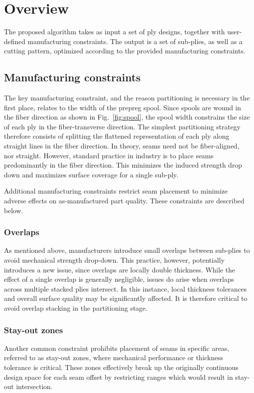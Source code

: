 \section{Overview}
\label{sec:overview}

The proposed algorithm takes as input a set of ply designs, together with user-defined manufacturing constraints. The output is a set of sub-plies, as well as a cutting pattern, optimized according to the provided manufacturing constraints.

\subsection{Manufacturing constraints}
The key manufacturing constraint, and the reason partitioning is necessary in the first place, relates to the width of the prepreg spool. Since spools are wound in the fiber direction as shown in Fig.~\ref{fig:spool}, the spool width constrains the size of each ply in the fiber-transverse direction. The simplest partitioning strategy therefore consists of splitting the flattened representation of each ply along straight lines in the fiber direction. In theory, seams need not be fiber-aligned, nor straight. However, standard practice in industry is to place seams predominantly in the fiber direction. This minimizes the induced strength drop down and maximizes surface coverage for a single sub-ply.

Additional manufacturing constraints restrict seam placement to minimize adverse effects on as-manufactured part quality. These constraints are described below.

\subsubsection{Overlaps}
As mentioned above, manufacturers introduce small overlaps between sub-plies to avoid mechanical strength drop-down. This practice, however, potentially introduces a new issue, since overlaps are locally double thickness. While the effect of a single overlap is generally negligible, issues do arise when overlaps across multiple stacked plies intersect. In this instance, local thickness tolerances and overall surface quality may be significantly affected. It is therefore critical to avoid overlap stacking in the partitioning stage.

\subsubsection{Stay-out zones}
Another common constraint prohibits placement of seams in specific areas, referred to as stay-out zones, where mechanical performance or thickness tolerance is critical. These zones effectively break up the originally continuous design space for each seam offset by restricting ranges which would result in stay-out intersection.

